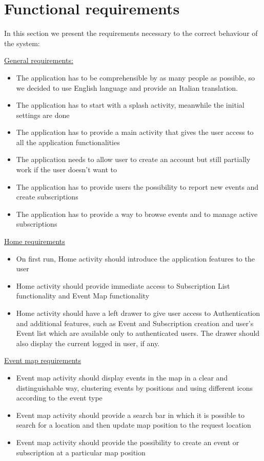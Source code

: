 \documentclass[a4paper]{scrreprt}
\begin{document}
\section{Functional requirements}
In this section we present the requirements necessary to the correct behaviour of the system:
\par \underline{General requirements:}
\begin{itemize}
\item The application has to be comprehensible by as many people as possible, so we decided to use English language and provide an Italian translation.
\item The application has to start with a splash activity, meanwhile the initial settings are done
\item The application has to provide a main activity that gives the user access to all the application functionalities
\item The application needs to allow user to create an account but still partially work if the user doesn't want to
\item The application has to provide users the possibility to report new events and create subscriptions
\item The application has to provide a way to browse events and to manage active subscriptions
\end{itemize}

\par \underline{Home requirements}
\begin{itemize}
\item On first run, Home activity should introduce the application features to the user
\item Home activity should provide immediate access to Subscription List functionality and Event Map functionality
\item Home activity should have a left drawer to give user access to Authentication and additional features, such as Event and Subscription creation and user's Event list which are available only to authenticated users. The drawer should also display the current logged in user, if any.

\end{itemize}

\par \underline{Event map requirements}
\begin{itemize}
\item Event map activity should display events in the map in a clear and distinguishable way, clustering events by positions and using different icons according to the event type
\item Event map activity should provide a search bar in which it is possible to search for a location and then update map position to the request location
\item Event map activity should provide the possibility to create an event or subscription at a particular map position
\end{itemize}
\end{document}

